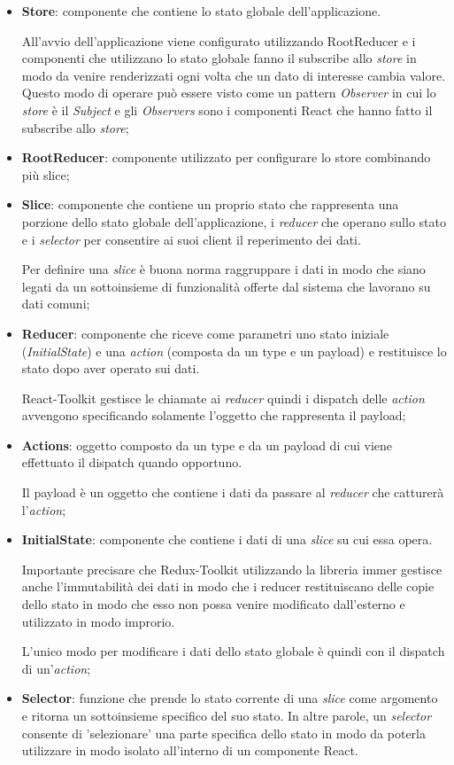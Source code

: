 \begin{itemize}
	\item \textbf{Store}: componente che contiene lo stato globale dell'applicazione.
	
	All'avvio dell'applicazione viene configurato utilizzando RootReducer e i componenti che utilizzano lo stato globale fanno il subscribe allo \textit{store}
	in modo da venire renderizzati ogni volta che un dato di interesse cambia valore.
	Questo modo di operare può essere visto come un pattern \textit{Observer} in cui lo \textit{store} è il \textit{Subject} e gli \textit{Observers} sono i componenti React che hanno fatto 
	il subscribe allo \textit{store};
	\item \textbf{RootReducer}: componente utilizzato per configurare lo store combinando più slice;
	\item \textbf{Slice}: componente che contiene un proprio stato che rappresenta una porzione dello stato globale dell'applicazione, i \textit{reducer}
	che operano sullo stato e i \textit{selector} per consentire ai suoi client il reperimento dei dati. 

	Per definire una \textit{slice} è buona norma raggruppare i dati in modo che siano legati da un sottoinsieme di funzionalità offerte dal sistema che lavorano 
	su dati comuni;  
	\item \textbf{Reducer}: componente che riceve come parametri uno stato iniziale (\textit{InitialState}) e una \textit{action} (composta da un type e un payload) e restituisce 
	lo stato dopo aver operato sui dati. 
	
	React-Toolkit gestisce le chiamate ai \textit{reducer} quindi i dispatch delle \textit{action} avvengono
	specificando solamente l'oggetto che rappresenta il payload; 
	\item \textbf{Actions}: oggetto composto da un type e da un payload di cui viene effettuato il dispatch quando opportuno. 
	
	Il payload è un oggetto che contiene i dati da passare al \textit{reducer} che catturerà l'\textit{action};
	\item \textbf{InitialState}: componente che contiene i dati di una \textit{slice} su cui essa opera. 
	
	Importante precisare che Redux-Toolkit utilizzando 
	la libreria immer gestisce anche l'immutabilità dei dati in modo che i reducer restituiscano delle copie dello stato in modo che esso non possa 
	venire modificato dall'esterno e utilizzato in modo improrio.
	
	L'unico modo per modificare i dati dello stato globale è quindi con il dispatch di un'\textit{action};
	\item \textbf{Selector}: funzione che prende lo stato corrente di una \textit{slice} come argomento e ritorna un sottoinsieme specifico
	del suo stato. In altre parole, un \textit{selector} consente di 'selezionare' una parte specifica dello stato
	in modo da poterla utilizzare in modo isolato all'interno di un componente React.
\end{itemize}

